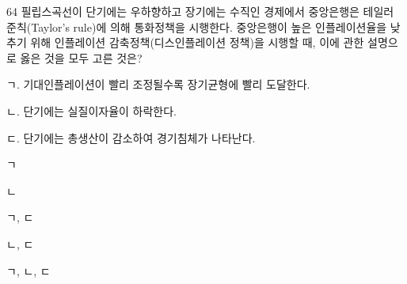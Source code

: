\begin{question}{64}
필립스곡선이 단기에는 우하향하고 장기에는 수직인 경제에서 중앙은행은 테일러 준칙(Taylor's rule)에 의해 통화정책을 시행한다. 중앙은행이 높은 인플레이션율을 낮추기 위해 인플레이션 감축정책(디스인플레이션 정책)을 시행할 때, 이에 관한 설명으로 옳은 것을 모두 고른 것은?
\begin{framedtext}
ㄱ. 기대인플레이션이 빨리 조정될수록 장기균형에 빨리 도달한다. \par
ㄴ. 단기에는 실질이자율이 하락한다. \par
ㄷ. 단기에는 총생산이 감소하여 경기침체가 나타난다. \par
\end{framedtext}
\begin{choices}
  \item ㄱ
  \item ㄴ
  \item ㄱ, ㄷ
  \item ㄴ, ㄷ
  \item ㄱ, ㄴ, ㄷ
\end{choices}
\end{question}
